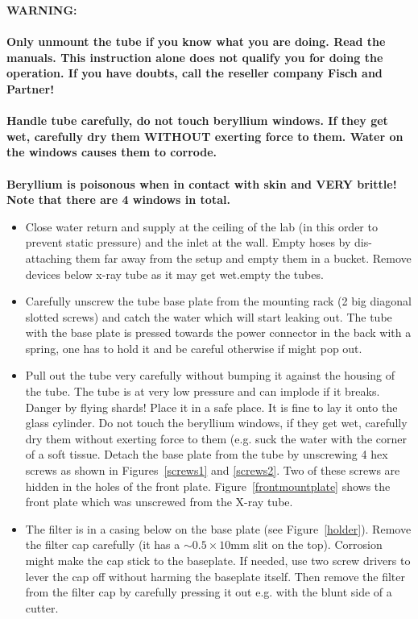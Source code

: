 \documentclass[a4paper,12pt,twoside]{article}
\begin{document}
\begin{appendices}
\textbf{
WARNING:  \\
\\
Only unmount the tube if you know what you are doing. Read the manuals. This instruction alone does not qualify you for doing the operation. If you have doubts, call the reseller company Fisch and Partner! 
\\
\\
Handle tube carefully, do not touch beryllium windows. If they get wet, carefully dry them WITHOUT exerting force to them. Water on the windows causes them to corrode.
\\
\\
Beryllium is poisonous when in contact with skin and VERY brittle! Note that there are 4 windows in total.}

\begin{itemize}

\item Close water return and supply at the ceiling of the lab (in this order to prevent static pressure) and the inlet at the wall. Empty hoses by dis-attaching them far away from the setup and empty them in a bucket. Remove devices below x-ray tube as it may get wet.empty the tubes. 

\item Carefully unscrew the tube base plate from the mounting rack (2 big diagonal slotted screws) and catch the water which will start leaking out. The tube with the base plate is pressed towards the power connector in the back with a spring, one has to hold it and be careful otherwise if might pop out.

\item Pull out the tube very carefully without bumping it against the housing of the tube. The tube is at very low pressure and can implode if it breaks. Danger by flying shards! Place it in a safe place. It is fine to lay it onto the glass cylinder. Do not touch the beryllium windows, if they get wet, carefully dry them without exerting force to them (e.g. suck the water with the corner of a soft tissue. Detach the base plate from the tube by unscrewing 4 hex screws as shown in Figures~\ref{screws1} and \ref{screws2}. Two of these screws are hidden in the holes of the front plate. Figure~\ref{frontmountplate} shows the front plate which was unscrewed from the X-ray tube.

\item The filter is in a casing below on the base plate (see Figure~\ref{holder}). Remove the filter cap carefully (it has a $\sim 0.5 \times 10$\;\si{\milli\meter} slit on the top). Corrosion might make the cap stick to the baseplate. If needed, use two screw drivers to lever the cap off without harming the baseplate itself. Then remove the filter from the filter cap by carefully pressing it out e.g. with the blunt side of a cutter.


\end{itemize}
\end{appendices}
\end{document}

